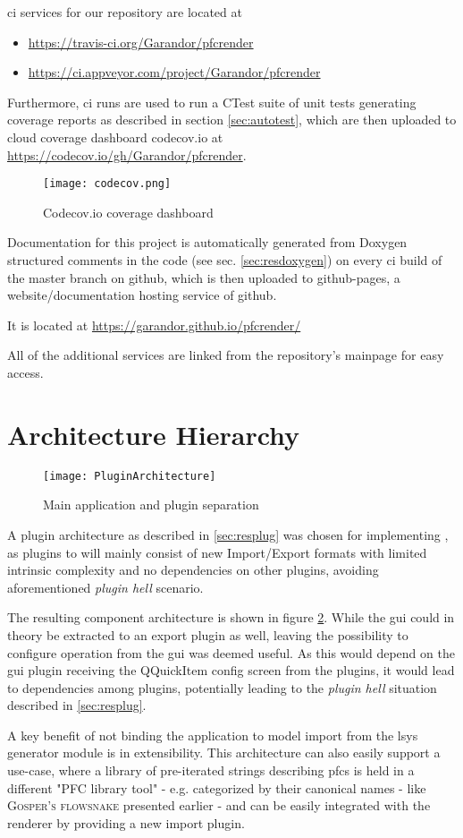 \gls{ci} services for our repository are located at
\begin{itemize}
	\item \url{https://travis-ci.org/Garandor/pfcrender}
	\item \url{https://ci.appveyor.com/project/Garandor/pfcrender}
\end{itemize}

Furthermore, \gls{ci} runs are used to run a CTest suite of unit tests generating \gls{coverage} reports as described in section \ref{sec:autotest}, which are then uploaded to cloud coverage dashboard codecov.io at \url{https://codecov.io/gh/Garandor/pfcrender}.

\begin{figure}
	\texttt{[image: codecov.png]}
	\caption{Codecov.io coverage dashboard}
	\label{fig:codecov}
\end{figure}

Documentation for this project is automatically generated from Doxygen structured comments in the code (see sec. \ref{sec:resdoxygen}) on every \gls{ci} build of the master branch on \gls{github}, which is then uploaded to github-pages, a website/documentation hosting service of \gls{github}.

It is located at \url{https://garandor.github.io/pfcrender/}

All of the additional services are linked from the repository's mainpage for easy access.

\section{Architecture Hierarchy}\label{sec:archplug}
\begin{figure}
	\texttt{[image: PluginArchitecture]}
	\caption{Main application and plugin separation}
	\label{fig:comp}
\end{figure}
A plugin architecture as described in \ref{sec:resplug} was chosen for implementing , as plugins to  will mainly consist of new Import/Export formats with limited intrinsic complexity and no dependencies on other plugins, avoiding aforementioned \textit{plugin hell} scenario.

The resulting component architecture is shown in figure \ref{fig:comp}. While the \gls{gui} could in theory be extracted to an export plugin as well, leaving the possibility to configure operation from the \gls{gui} was deemed useful. As this would depend on the \gls{gui} plugin receiving the QQuickItem config screen from the plugins, it would lead to dependencies among plugins, potentially leading to the \textit{plugin hell} situation described in \ref{sec:resplug}.

A key benefit of not binding the application to model import from the \gls{lsys} generator module is in extensibility. This architecture can also easily support a use-case, where a library of pre-iterated strings describing \gls{pfc}s is held in a different "PFC library tool" - e.g. categorized by their canonical names - like \textsc{Gosper's flowsnake} presented earlier - and can be easily integrated with the renderer by providing a new import plugin.

